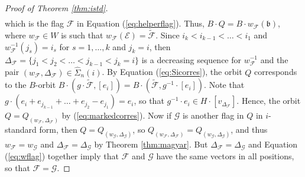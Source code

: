 \documentclass[12pt]{amsart}
\numberwithin{equation}{section}
\theoremstyle{remark}
\theoremstyle{definition}
\newcommand{\fb}{\mbox{${\mathfrak b}$}}
\newcommand{\F}{\mathcal{F}}
\newcommand{\G}{\mathcal{G}}
\begin{document}
\begin{proof}[Proof of Theorem \ref{thm:istd}]
\begin{equation*}
\begin{split}
\end{split}
\end{equation*}
which is the flag $\F$ in Equation (\ref{eq:helperflag}).  Thus, $B\cdot Q=B\cdot w_{\F}(\fb)$, where $w_{\F}\in W$ is such that $w_{\F}(\mathcal{E})=\tilde{\F}$. 
Since $i_k<i_{k-1}< \dots < i_1$ and $w_{\F}^{-1}(j_s)=i_s$ for $s=1, \dots, k$ and $j_k=i$, then $\Delta_{\F} = \{ j_1 < j_2 < \dots < j_{k-1} < j_k=i\}$  
 is a decreasing sequence for $w_{\F}^{-1}$ and the pair $(w_{\F},\Delta_{\F})\in\widehat{\Sigma}_{n}(i)$.   By Equation (\ref{eq:Sicorres}), the orbit $Q$ corresponds to the $B$-orbit 
$B\cdot (g\cdot \tilde{\F}, [e_{i}])=B\cdot (\tilde{\F}, g^{-1}\cdot[e_{i}])$.
Note that $g\cdot (e_{i}+e_{j_{k-1}}+\dots+e_{j_{2}}-e_{j_{1}})=e_i$, so that $g^{-1}\cdot e_i \in H\cdot [v_{\Delta_{\F}}].$  Hence, the orbit $Q=Q_{(w_{\F},\Delta_{\F})}$ by (\ref{eq:markedcorres}). 
Now if ${\mathcal{G}}$ is another flag in $Q$ in $i$-standard form, then 
$Q=Q_{(w_{\G},\Delta_{\G})}$, so $Q_{(w_{\F},\Delta_{\F})}=Q_{(w_{\G},\Delta_{\G})}$, and
thus $w_{\F}=w_{\G}$ and $\Delta_{\F}=\Delta_{\G}$ by Theorem \ref{thm:magyar}.  But $\Delta_{\F}=\Delta_{\G}$ and Equation (\ref{eq:wflag}) together  imply that $\F$ and $\G$ have the same vectors in all positions,  so that $\F=\G.$


\end{proof}
\end{document}
